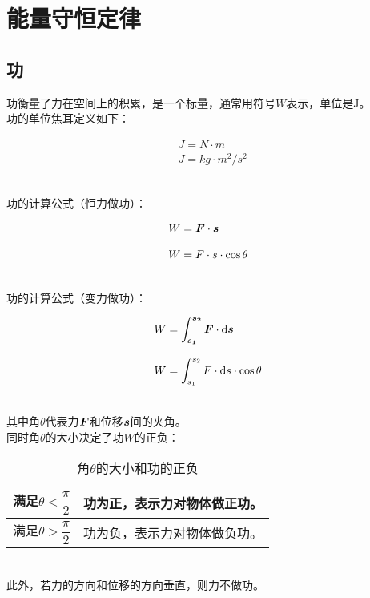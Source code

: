 \documentclass[UTF8]{ctexart}
\newcommand*{\veb}[1]{\vb*{#1}}
\newcommand*{\dif}{\mathop{}\!\mathrm{d}}
\begin{document}
\newpage

\section{能量守恒定律}

\subsection{功}
    功衡量了力在空间上的积累，是一个标量，通常用符号$W$表示，单位是\si{J}。\\[3mm]
    功的单位焦耳定义如下：
    \begin{large}
        \begin{align*}
            &\si{J=N\cdot m}\\[3mm]
            &\si{J=kg\cdot m^2/s^2}
        \end{align*}
    \end{large}\\
    功的计算公式（恒力做功）：
    \begin{large}
        \begin{align*}
            &W=\veb{F}\cdot\veb{s}\\[3mm]
            &W=F\cdot s\cdot\cos{\theta}
        \end{align*}
    \end{large}\\
    功的计算公式（变力做功）：
    \begin{large}
        \begin{align*}
            &W=\int_{\veb{s_1}}^{\veb{s_2}}\veb{F}\cdot\dif\veb{s}\\[3mm]
            &W=\int_{s_1}^{s_2}F\cdot\dif s\cdot\cos{\theta}
        \end{align*}
    \end{large}\\
    其中角$\theta$代表力$\veb{F}$和位移$\veb{s}$间的夹角。\\[5mm]
    同时角$\theta$的大小决定了功$W$的正负：\vspace{5pt}
    \begin{table}[h]
        \begin{center}
            \begin{tabular}{p{80pt}|p{160pt}}
                \hline
                满足$\theta<\dfrac{\pi}{2}$\vphantom{$\Biggl(\Biggr)$}&功为正，表示力对物体做正功。\\ \hline
                满足$\theta>\dfrac{\pi}{2}$\vphantom{$\Biggl(\Biggr)$}&功为负，表示力对物体做负功。\\ \hline
            \end{tabular}
            \caption{角$\theta$的大小和功的正负}
        \end{center}
    \end{table}\\
    此外，若力的方向和位移的方向垂直，则力不做功。
\end{document}
